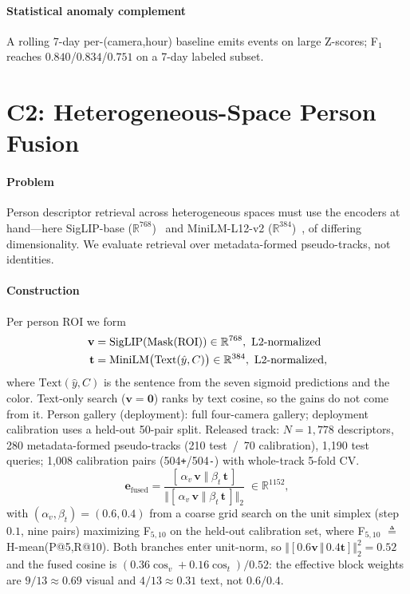 ﻿\documentclass[conference]{IEEEtran}
\theoremstyle{plain}
\begin{document}
\paragraph*{Statistical anomaly complement} A rolling 7-day per-(camera,hour) baseline emits events on large Z-scores; F$_1$ reaches $0.840$/$0.834$/$0.751$ on a 7-day labeled subset.

\section{C2: Heterogeneous-Space Person Fusion}\label{sec:fusion}

\paragraph*{Problem}
Person descriptor retrieval across heterogeneous spaces must use the
encoders at hand---here SigLIP-base ($\mathbb{R}^{768}$)~\cite{b24} and
MiniLM-L12-v2 ($\mathbb{R}^{384}$)~\cite{b23}, of differing dimensionality.
We evaluate retrieval over metadata-formed pseudo-tracks, not identities.

\paragraph*{Construction}
Per person ROI we form
\begin{align}
\mathbf{v} &= \mathrm{SigLIP}(\mathrm{Mask}(\mathrm{ROI})) \in\mathbb{R}^{768},\ \text{L2-normalized} \notag\\
\mathbf{t} &= \mathrm{MiniLM}\bigl(\mathrm{Text}(\hat{y}, C)\bigr) \in\mathbb{R}^{384},\ \text{L2-normalized},
\end{align}
where $\mathrm{Text}(\hat{y}, C)$ is the sentence from the seven sigmoid predictions and the color. Text-only search ($\mathbf{v}{=}\mathbf{0}$) ranks by text cosine, so the gains do not come from it. Person gallery (deployment): full four-camera gallery; deployment calibration uses a held-out 50-pair split. Released track: $N{=}1{,}778$ descriptors, 280 metadata-formed pseudo-tracks (210 test~/~70 calibration), 1{,}190 test queries; 1{,}008 calibration pairs (504\texttt{+}/504\texttt{-}) with whole-track 5-fold CV.
\begin{equation}
\mathbf{e}_{\text{fused}} = \frac{[\,\alpha_v\,\mathbf{v}\;\Vert\;\beta_t\,\mathbf{t}\,]}{\bigl\Vert [\,\alpha_v\,\mathbf{v}\;\Vert\;\beta_t\,\mathbf{t}\,]\bigr\Vert_2}\;\in\mathbb{R}^{1152},
\label{eq:fusion}
\end{equation}
with $(\alpha_v,\beta_t)=(0.6, 0.4)$ from a coarse grid search on the unit simplex (step $0.1$, nine pairs) maximizing F$_{5,10}$ on the held-out calibration set, where F$_{5,10}$ $\triangleq$ H-mean(P@5,R@10). Both branches enter unit-norm, so $\Vert[0.6\mathbf{v}\,\Vert\,0.4\mathbf{t}]\Vert_2^2{=}0.52$ and the fused cosine is $(0.36\cos_v{+}0.16\cos_t)/0.52$: the effective block weights are $9/13{\approx}0.69$ visual and $4/13{\approx}0.31$ text, not $0.6/0.4$.
\end{document}
